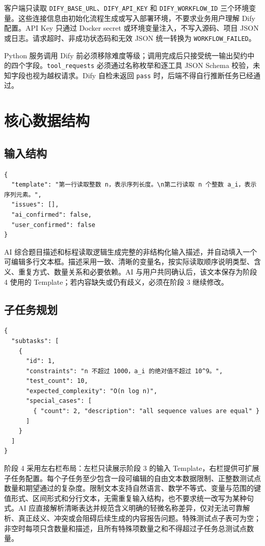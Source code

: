 \documentclass[UTF8,zihao=-4]{ctexart}
\begin{document}
客户端只读取 \texttt{DIFY\_BASE\_URL}、\texttt{DIFY\_API\_KEY} 和 \texttt{DIFY\_WORKFLOW\_ID} 三个环境变量。这些连接信息由初始化流程生成或写入部署环境，不要求业务用户理解 Dify 配置。API Key 只通过 Docker secret 或环境变量注入，不写入源码、项目 JSON 或日志。请求超时、非成功状态码和无效 JSON 统一转换为 \texttt{WORKFLOW\_FAILED}。

Python 服务调用 Dify 前必须移除难度等级；调用完成后只接受统一输出契约中的四个字段。\texttt{tool\_requests} 必须通过名称枚举和逐工具 JSON Schema 校验，未知字段也视为越权请求。Dify 自检未返回 \texttt{pass} 时，后端不得自行推断任务已经通过。

\section{核心数据结构}

\subsection{输入结构}

\begin{lstlisting}
{
  "template": "第一行读取整数 n，表示序列长度。\n第二行读取 n 个整数 a_i，表示序列元素。",
  "issues": [],
  "ai_confirmed": false,
  "user_confirmed": false
}
\end{lstlisting}

AI 综合题目描述和标程读取逻辑生成完整的非结构化输入描述，并自动填入一个可编辑多行文本框。描述采用一致、清晰的变量名，按实际读取顺序说明类型、含义、重复方式、数量关系和必要依赖。AI 与用户共同确认后，该文本保存为阶段 4 使用的 Template；若内容缺失或仍有歧义，必须在阶段 3 继续修改。

\subsection{子任务规划}

\begin{lstlisting}
{
  "subtasks": [
    {
      "id": 1,
      "constraints": "n 不超过 1000，a_i 的绝对值不超过 10^9。",
      "test_count": 10,
      "expected_complexity": "O(n log n)",
      "special_cases": [
        { "count": 2, "description": "all sequence values are equal" }
      ]
    }
  ]
}
\end{lstlisting}

阶段 4 采用左右栏布局：左栏只读展示阶段 3 的输入 Template，右栏提供可扩展子任务配置。每个子任务至少包含一段可编辑的自由文本数据限制、正整数测试点数量和期望通过的复杂度。限制文本支持自然语言、数学不等式、变量与范围的键值形式、区间形式和分行文本，无需重复输入结构，也不要求统一改写为某种句式。AI 应直接解析清晰表达并规范含义明确的轻微名称差异，仅对无法可靠解析、真正歧义、冲突或会阻碍后续生成的内容报告问题。特殊测试点子表可为空；非空时每项只含数量和描述，且所有特殊项数量之和不得超过子任务总测试点数量。
\end{document}
